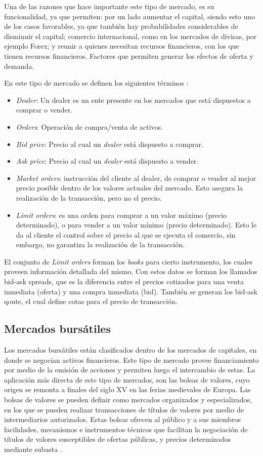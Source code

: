 Una de las razones que hace importante este tipo de mercado, es su
funcionalidad, ya que permiten: por un lado aumentar el capital, siendo esto
uno de los casos favorables, ya que también hay probabilidades considerables de
disminuir el capital; comercio internacional, como en los mercados de divisas,
por ejemplo Forex; y reunir a quienes necesitan recursos financieros, con los
que tienen recursos financieros. Factores que permiten generar los efectos de
oferta y demanda.

En este tipo de mercado se definen los siguientes términos \cite{nevmyvaka2003electronic}:
\begin{itemize}
	\item \emph{Dealer}: Un dealer es un ente presente en los mercados que está
dispuestos a comprar o vender.
	\item \emph{Orders}: Operación de compra/venta de activos.
	\item \emph{Bid price}: Precio al cual un \emph{dealer} está dispuesto a
comprar.
	\item \emph{Ask price}: Precio al cual un \emph{dealer} está dispuesto a
vender.
	\item \emph{Market orders}: instrucción del cliente al dealer, de comprar o
vender al mejor precio posible dentro de los valores actuales del mercado.
Esto asegura la realización de la transacción, pero no el precio.
	\item \emph{Limit orders}: es una orden para comprar a un valor máximo
(precio determinado), o para vender a un valor mínimo (precio determinado).
Esto le da al cliente el control sobre el precio al que se ejecuta el comercio,
sin embargo, no garantiza la realización de la transacción.
\end{itemize}

El conjunto de \emph{Limit orders} forman los \emph{books} para cierto
instrumento, los cuales proveen información detallada del mismo. Con estos
datos se forman los llamados bid-ask spreads, que es la diferencia entre el
precios cotizados para una venta inmediata (oferta) y una compra inmediata
(bid).  También se generan los bid-ask qoute, el cual define cotas para el
precio de transacción.

\subsection{Mercados bursátiles}
Los mercados bursátiles están clasificados dentro de los mercados de capitales,
en donde se negocian activos financieros. Este tipo de mercado provee
financiamiento por medio de la emisión de acciones y permiten luego el
intercambio de estas. La aplicación más directa de este tipo de mercados, son
las bolsas de valores, cuyo origen se remonta a finales del siglo XV en las
ferias medievales de Europa. Las bolsas de valores se pueden definir como
mercados organizados y especializados, en los que se pueden realizar
transacciones de títulos de valores por medio de intermediarios autorizados.
Estas bolsas ofrecen al público y a sus miembros facilidades, mecanismos e
instrumentos técnicos que facilitan la negociación de títulos de valores
susceptibles de ofertas públicas, y precios determinados mediante subasta
\cite{levine1998stock}.

